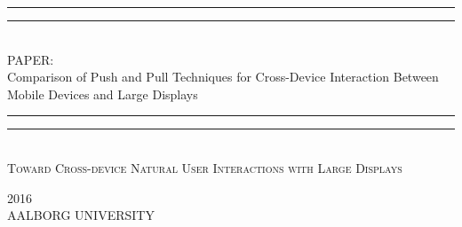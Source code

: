 
\begin{dummy}

	\textheight
	\centering
	\vspace*{\baselineskip}
	\rule{\textwidth}{1.6pt}\vspace*{-\baselineskip}\vspace*{2pt}
	\rule{\textwidth}{0.4pt}\\[\baselineskip]
	{\LARGE PAPER: \\ \hfill \break Comparison of Push and Pull Techniques for Cross-Device Interaction Between Mobile Devices and Large Displays}\\[0.2\baselineskip]
	\rule{\textwidth}{0.4pt}\vspace*{-\baselineskip}\vspace{3.2pt}
	\rule{\textwidth}{1.6pt}\\[\baselineskip]
	\scshape
	{ \large Toward Cross-device Natural User Interactions with Large Displays } \par
	\vspace*{2\baselineskip}
	\vspace*{2\baselineskip}

	\begin{newab}
		
	\end{newab}

	\vspace*{2\baselineskip}
		{\scshape 2016} \\
		{\large AALBORG UNIVERSITY}\par
	
\end{dummy}